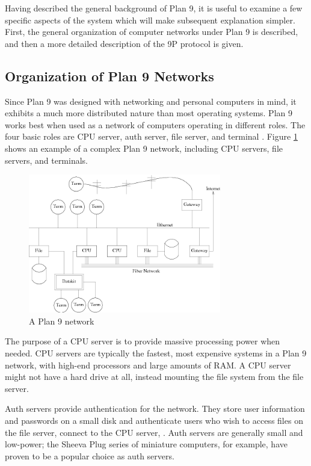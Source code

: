 \documentclass[11pt,american]{report}
\begin{document}
Having described the general background of Plan 9, it is useful to examine a few specific aspects of the system which will make subsequent explanation simpler. First, the general organization of computer networks under Plan 9 is described, and then a more detailed description of the 9P protocol is given.

\subsection{Organization of Plan 9 Networks}

Since Plan 9 was designed with networking and personal computers in mind, it exhibits a much more distributed nature than most operating systems. Plan 9 works best when used as a network of computers operating in different roles. The four basic roles are CPU server, auth server, file server, and terminal \cite{Pike95:PBL}. Figure \ref{figure:p9net} shows an example of a complex Plan 9 network, including CPU servers, file servers, and terminals.

\begin{figure}[h]
	\begin{center}
		\includegraphics[width=0.75\textwidth]{p9net.png}
	\end{center}
	\caption{A Plan 9 network\cite{Pike95:PBL}}
	\label{figure:p9net}
\end{figure}

The purpose of a CPU server is to provide massive processing power when needed. CPU servers are typically the fastest, most expensive systems in a Plan 9 network, with high-end processors and large amounts of RAM. A CPU server might not have a hard drive at all, instead mounting the file system from the file server.

Auth servers provide authentication for the network. They store user information and passwords on a small disk and authenticate users who wish to access files on the file server, connect to the CPU server, \etc. Auth servers are generally small and low-power; the Sheeva Plug series of miniature computers, for example, have proven to be a popular choice as auth servers.
\end{document}

